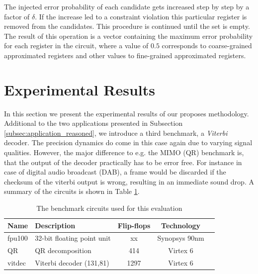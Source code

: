 \documentclass[conference]{IEEEtran}
\begin{document}
The injected error probability of each candidate gets increased step by step by a factor of $\delta$. If the increase led to a constraint violation this particular register is removed from the candidates. This procedure is continued until the set is empty. The result of this operation is a vector containing the maximum error probability for each register in the circuit, where a value of $0.5$ corresponds to coarse-grained approximated registers and other values to fine-grained approximated registers.
\section{Experimental Results}
\label{sec:experimental_results}
In this section we present the experimental results of our proposes methodology. Additional to the two applications presented in Subsection \ref{subsec:application_reasoned}, we introduce a third benchmark, a \emph{Viterbi} decoder. The precision dynamics do come in this case again due to varying signal qualities. However, the major difference to e.g. the MIMO (QR) benchmark is, that the output of the decoder practically has to be error free. For instance in case of digital audio broadcast (DAB), a frame would be discarded if the checksum of the viterbi output is wrong, resulting in an immediate sound drop. A summary of the circuits is shown in Table \ref{tab:benchmark_circuits}.
\begin{table}[htb]
\caption{The benchmark circuits used for this evaluation}
\label{tab:benchmark_circuits}
\centering
\begin{tabular} {| l | l | c | c | c |}
\hline
Name & Description  & Flip-flops & Technology\\
\hline\hline
fpu100 \cite{al2007fpu100} & 32-bit floating point unit  & xx & Synopsys 90nm\\
QR \cite{gimmler-dumont_asic_2013} & QR decomposition  & 414 & Virtex 6\\
vitdec \cite{fehrenz2014viterbi} & Viterbi decoder (131,81)  & 1297 & Virtex 6\\
\hline
\end{tabular}
\end{table}
\end{document}
